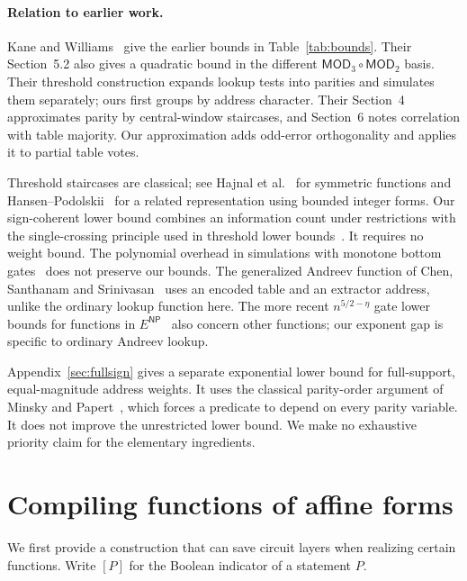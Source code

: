 \documentclass[11pt]{article}
\begin{document}
\paragraph{Relation to earlier work.}
Kane and Williams~\cite[Theorems~1.1--1.2]{KW} give the earlier bounds
in Table~\ref{tab:bounds}. Their Section~5.2 also gives a quadratic bound
in the different $\mathsf{MOD}_3\circ\mathsf{MOD}_2$ basis. Their threshold
construction expands lookup tests into parities and simulates them
separately; ours first groups by address character. Their Section~4
approximates parity by central-window staircases, and Section~6 notes
correlation with table majority. Our approximation adds odd-error
orthogonality and applies it to partial table votes.

Threshold staircases are classical; see Hajnal et al.~\cite[Proposition~2.1]{HMPST}
for symmetric functions and Hansen--Podolskii~\cite[Theorem~5]{HP} for a
related representation using bounded integer forms. Our sign-coherent
lower bound combines an information count under restrictions with the
single-crossing principle used in threshold lower bounds~\cite{IPS}.
It requires no weight bound. The polynomial overhead in simulations
with monotone bottom gates~\cite[Lemma~6]{HP} does not preserve our bounds.
The generalized Andreev function of Chen, Santhanam and
Srinivasan~\cite[Section~2.4]{CSS} uses an encoded table and an extractor
address, unlike the ordinary lookup function here. The more recent
$n^{5/2-\eta}$ gate lower bounds for functions in
$E^{\mathsf{NP}}$~\cite{CTW} also concern other functions; our exponent
gap is specific to ordinary Andreev lookup.

Appendix~\ref{sec:fullsign} gives a separate exponential lower bound
for full-support, equal-magnitude address weights. It uses the classical
parity-order argument of Minsky and Papert~\cite[Section~3.1]{MP}, which
forces a predicate to depend on every parity variable. It does not
improve the unrestricted lower bound. We make no exhaustive priority
claim for the elementary ingredients.

\section{Compiling functions of affine forms}\label{sec:identities}
We first provide a construction that can save circuit layers when
realizing certain functions. Write $[P]$ for the Boolean indicator of a statement $P$.
\end{document}
